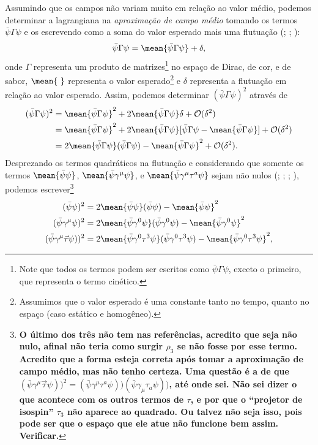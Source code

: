 Assumindo que os campos não variam muito em relação ao valor médio, podemos determinar a lagrangiana na \emph{aproximação de campo médio} tomando os termos $\bar{\psi}\Gamma\psi$ e os escrevendo como a soma do valor esperado mais uma flutuação (\cite[p.~100]{Moeller}; \cite{japoneses}; \cite{japoneses2}):
\begin{equation}
    \bar{\psi}\Gamma\psi = \mean{\bar{\psi}\Gamma\psi} + \delta,
\end{equation}
%
onde $\Gamma$ representa um produto de matrizes\footnote{Note que todos os termos podem ser escritos como $\bar{\psi}\Gamma\psi$, exceto o primeiro, que representa o termo cinético.} no espaço de Dirac, de cor, e de sabor, $\mean{~}$ representa o valor esperado\footnote{Assumimos que o valor esperado é uma constante tanto no tempo, quanto no espaço (caso estático e homogêneo).} e $\delta$ representa a flutuação em relação ao valor esperado. Assim, podemos determinar $(\bar{\psi}\Gamma\psi)^2$ através de
\begin{align}
    (\bar{\psi}\Gamma\psi)^2 &= \mean{\bar{\psi}\Gamma\psi}^2 + 2 \mean{\bar{\psi}\Gamma\psi}\delta + \mathcal{O}(\delta^2) \\
    &= \mean{\bar{\psi}\Gamma\psi}^2 + 2 \mean{\bar{\psi}\Gamma\psi}[\bar{\psi}\Gamma\psi - \mean{\bar{\psi}\Gamma\psi}] + \mathcal{O}(\delta^2) \\
    &= 2 \mean{\bar{\psi}\Gamma\psi}(\bar{\psi}\Gamma\psi) - \mean{\bar{\psi}\Gamma\psi}^2 + \mathcal{O}(\delta^2).
\end{align}
%
Desprezando os termos quadráticos na flutuação e considerando que somente os termos $\mean{\bar{\psi}\psi}$, $\mean{\bar{\psi}\gamma^\mu\psi}$, e $\mean{\bar{\psi}\gamma^\mu\tau^a\psi}$ sejam não nulos (\cite{Buballa}; \cite{Moeller}; \cite{japoneses}; \cite{japoneses2}), podemos escrever\footnote{\bf O último dos três não tem nas referências, acredito que seja não nulo, afinal não teria como surgir $\rho_3$ se não fosse por esse termo. Acredito que a forma esteja correta após tomar a aproximação de campo médio, mas não tenho certeza. Uma questão é a de que $(\bar\psi\gamma^\mu\vec{\tau}\psi))^2 = (\bar\psi\gamma^\mu\tau^a\psi))(\bar\psi\gamma_\mu\tau_a\psi))$, até onde sei. Não sei dizer o que acontece com os outros termos de $\tau$, e por que o ``projetor de isospin'' $\tau_3$ não aparece ao quadrado. Ou talvez não seja isso, pois pode ser que o espaço que ele atue não funcione bem assim. \textbf{Verificar}.}
\begin{align}
    (\bar\psi\psi)^2 &= 2 \mean{\bar\psi\psi}(\bar\psi\psi) - \mean{\bar\psi\psi}^2 \\
    (\bar\psi\gamma^\mu\psi)^2 &= 2\mean{\bar\psi\gamma^0\psi}(\bar\psi\gamma^0\psi)-\mean{\bar\psi\gamma^0\psi}^2 \\
    (\bar\psi\gamma^\mu\vec{\tau}\psi))^2 &= 2\mean{\bar\psi\gamma^0\tau^3\psi}(\bar\psi\gamma^0\tau^3\psi) - \mean{\bar\psi\gamma^0\tau^3\psi}^2,
\end{align}
